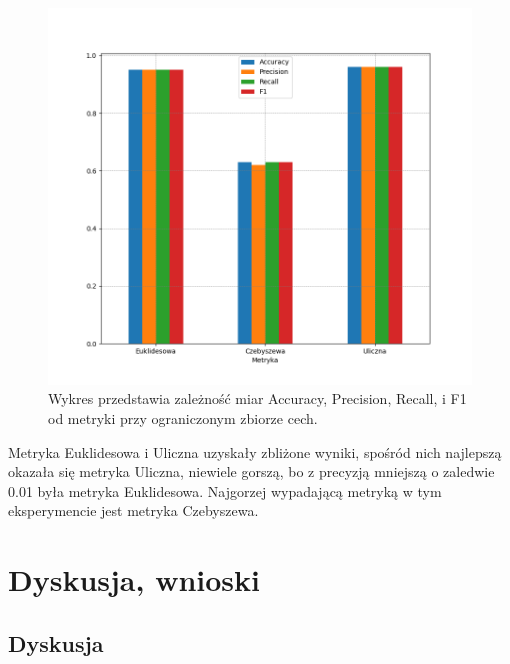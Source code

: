 \documentclass{classrep}
\begin{document}
\begin{figure}[h!]
 \centering
 \includegraphics[width=15cm]{wykres_metryka_2.png}
 \vspace{-0.3cm}
 \caption{Wykres przedstawia zależność miar Accuracy, Precision, Recall, i F1 od metryki przy ograniczonym zbiorze cech.}
 \label{wykres5}
\end{figure}

Metryka Euklidesowa i Uliczna uzyskały zbliżone wyniki, spośród nich najlepszą okazała się metryka Uliczna, niewiele gorszą, bo z precyzją mniejszą o zaledwie 0.01 była metryka Euklidesowa. Najgorzej wypadającą metryką w tym eksperymencie jest metryka Czebyszewa. 

\section{Dyskusja, wnioski}
\subsection{Dyskusja}
\end{document}
